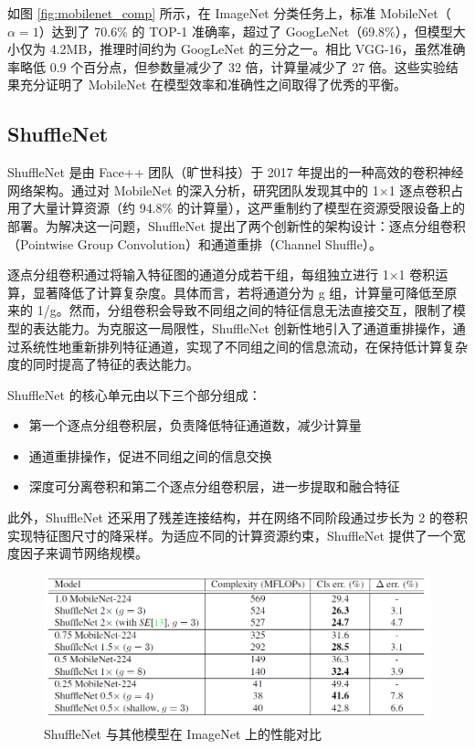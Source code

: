 \documentclass{article}
\begin{document}
如图 \ref{fig:mobilenet_comp} 所示，在 ImageNet 分类任务上，标准 MobileNet（$\alpha=1$）达到了 70.6\% 的 TOP-1 准确率，超过了 GoogLeNet（69.8\%），但模型大小仅为 4.2MB，推理时间约为 GoogLeNet 的三分之一。相比 VGG-16，虽然准确率略低 0.9 个百分点，但参数量减少了 32 倍，计算量减少了 27 倍。这些实验结果充分证明了 MobileNet 在模型效率和准确性之间取得了优秀的平衡。

\subsection{ShuffleNet}
ShuffleNet\cite{zhang2018shufflenet} 是由 Face++ 团队（旷世科技）于 2017 年提出的一种高效的卷积神经网络架构。通过对 MobileNet 的深入分析，研究团队发现其中的 1$\times$1 逐点卷积占用了大量计算资源（约 94.8\% 的计算量），这严重制约了模型在资源受限设备上的部署。为解决这一问题，ShuffleNet 提出了两个创新性的架构设计：逐点分组卷积（Pointwise Group Convolution）和通道重排（Channel Shuffle）。

逐点分组卷积通过将输入特征图的通道分成若干组，每组独立进行 1$\times$1 卷积运算，显著降低了计算复杂度。具体而言，若将通道分为 g 组，计算量可降低至原来的 1/g。然而，分组卷积会导致不同组之间的特征信息无法直接交互，限制了模型的表达能力。为克服这一局限性，ShuffleNet 创新性地引入了通道重排操作，通过系统性地重新排列特征通道，实现了不同组之间的信息流动，在保持低计算复杂度的同时提高了特征的表达能力。

ShuffleNet 的核心单元由以下三个部分组成：
\begin{itemize}
    \item 第一个逐点分组卷积层，负责降低特征通道数，减少计算量
    \item 通道重排操作，促进不同组之间的信息交换
    \item 深度可分离卷积和第二个逐点分组卷积层，进一步提取和融合特征
\end{itemize}

此外，ShuffleNet 还采用了残差连接结构，并在网络不同阶段通过步长为 2 的卷积实现特征图尺寸的降采样。为适应不同的计算资源约束，ShuffleNet 提供了一个宽度因子来调节网络规模。

\begin{figure}[htbp]
    \centering
    \includegraphics[width=0.8\linewidth]{imgs/shufflenet_comp.png}
    \caption{ShuffleNet 与其他模型在 ImageNet 上的性能对比}
    \label{fig:shufflenet_comp}
\end{figure}
\end{document}
